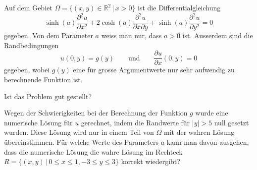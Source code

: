 Auf dem Gebiet $\Omega=\{(x,y)\in\mathbb R^2\,|\, x>0\}$ ist die
Differentialgleichung
\begin{equation}
\sinh(a)\frac{\partial^2 u}{\partial x^2}
+
2\cosh(a)\frac{\partial^2 u}{\partial x\partial y}
+
\sinh(a)\frac{\partial^2 u}{\partial y^2}
=
0
\label{90000013:dgl}
\end{equation}
gegeben.
Von dem Parameter $a$ weiss man nur, dass $a>0$ ist.
Ausserdem sind die Randbedingungen
\[
u(0,y)=g(y)\qquad\text{und}\qquad \frac{\partial u}{\partial x}(0,y)=0
\]
gegeben, wobei $g(y)$ eine für grosse Argumentwerte nur sehr aufwendig zu
berechnende Funktion ist.
\begin{teilaufgaben}
\item
Ist das Problem gut gestellt?
\item
Wegen der Schwierigkeiten bei der Berechnung der Funktion $g$
wurde eine numerische Lösung für $u$ gerechnet, indem die
Randwerte für $|y|>5$ null gesetzt wurden.
Diese Lösung wird nur in einem Teil von $\Omega$ mit der wahren Lösung
übereinstimmen.
Für welche Werte des Parameters $a$ kann man davon ausgehen, dass die
numerische Lösung die wahre Lösung im Rechteck
$R=\{(x,y)\,|\, 0\le x\le 1,-3\le y\le 3\}$ korrekt
wiedergibt?
\end{teilaufgaben}


